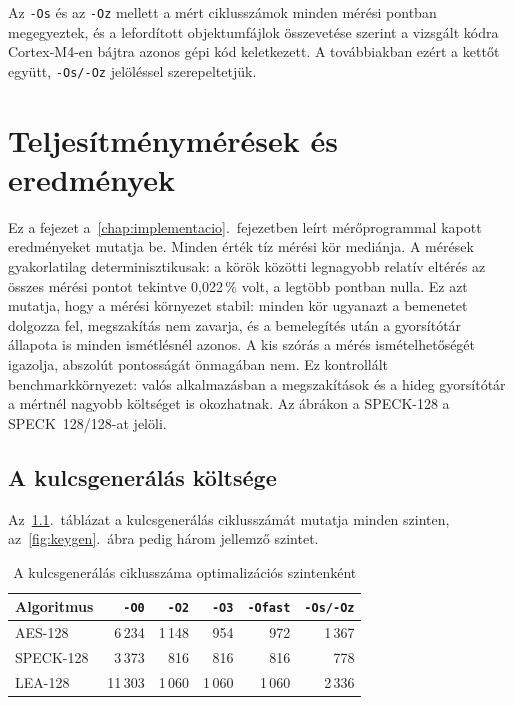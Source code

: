 \documentclass[a4paper,12pt]{report}
\theoremstyle{definition}
\theoremstyle{remark}
\begin{document}
Az \texttt{-Os} és az \texttt{-Oz} mellett a mért ciklusszámok minden mérési pontban megegyeztek, és a lefordított objektumfájlok összevetése szerint a vizsgált kódra Cortex-M4-en bájtra azonos gépi kód keletkezett. A továbbiakban ezért a kettőt együtt, \texttt{-Os/-Oz} jelöléssel szerepeltetjük.

\chapter{Teljesítménymérések és eredmények}\label{chap:meresek}

Ez a fejezet a~\ref{chap:implementacio}.~fejezetben leírt mérőprogrammal kapott eredményeket mutatja be. Minden érték tíz mérési kör mediánja. A mérések gyakorlatilag determinisztikusak: a körök közötti legnagyobb relatív eltérés az összes mérési pontot tekintve 0,022\,\% volt, a legtöbb pontban nulla. Ez azt mutatja, hogy a mérési környezet stabil: minden kör ugyanazt a bemenetet dolgozza fel, megszakítás nem zavarja, és a bemelegítés után a gyorsítótár állapota is minden ismétlésnél azonos. A kis szórás a mérés ismételhetőségét igazolja, abszolút pontosságát önmagában nem. Ez kontrollált benchmarkkörnyezet: valós alkalmazásban a megszakítások és a hideg gyorsítótár a mértnél nagyobb költséget is okozhatnak. Az ábrákon a SPECK-128 a SPECK~128/128-at jelöli.

\section{A kulcsgenerálás költsége}\label{sec:keygen}

Az~\ref{tab:keygen}.~táblázat a kulcsgenerálás ciklusszámát mutatja minden szinten, az~\ref{fig:keygen}.~ábra pedig három jellemző szintet.

\begin{table}[!htbp]
    \centering
    \small
    \caption{A kulcsgenerálás ciklusszáma optimalizációs szintenként}
    \label{tab:keygen}
    \begin{tabular}{|l|r|r|r|r|r|}
        \hline
        \textbf{Algoritmus} & \textbf{\texttt{-O0}} & \textbf{\texttt{-O2}} & \textbf{\texttt{-O3}} & \textbf{\texttt{-Ofast}} & \textbf{\texttt{-Os/-Oz}} \\ \hline
        AES-128    & 6\,234  & 1\,148 & 954    & 972    & 1\,367 \\ \hline
        SPECK-128  & 3\,373  & 816    & 816    & 816    & 778    \\ \hline
        LEA-128    & 11\,303 & 1\,060 & 1\,060 & 1\,060 & 2\,336 \\ \hline
    \end{tabular}
\end{table}
\end{document}

